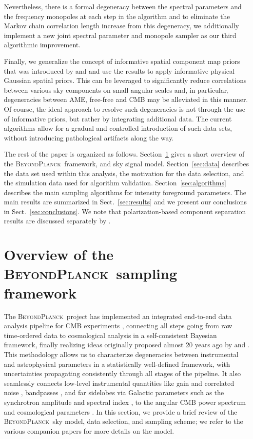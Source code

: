 \documentclass{aa}
\newcommand{\BP}{\textsc{BeyondPlanck}}
\begin{document}
Nevertheless, there is a formal degeneracy between the spectral
parameters and the frequency monopoles at each step in the algorithm
and to eliminate the Markov chain correlation length increase from
this degeneracy, we additionally implement a new joint spectral
parameter and monopole sampler as our third algorithmic improvement.

Finally, we generalize the concept of informative spatial
component map priors that was introduced by
\citet{planck2016-l04} and \citet{npipe} and use the results to apply informative
physical Gaussian spatial priors. This can be leveraged to significantly
reduce correlations between various sky components on small angular
scales and, in particular, degeneracies between AME, free-free and CMB
\citep{bp11} may be alleviated in this manner. Of course, the ideal
approach to resolve such degeneracies is not through the use of informative
priors, but rather by integrating additional data. The
current algorithms allow for a gradual and controlled introduction of
such data sets, without introducing pathological artifacts along the
way. 

The rest of the paper is organized as follows.  Section~\ref{sec:bp}
gives a short overview of the \BP\ framework, and sky
signal model. Section~\ref{sec:data}
describes the data set used within this analysis, the motivation for 
the data selection, and the simulation data used for algorithm validation. Section~\ref{sec:algorithms} describes the main
sampling algorithms for intensity foreground parameters. The main
results are summarized in Sect.~\ref{sec:results} and we present our conclusions
in Sect.~\ref{sec:conclusions}. We note that polarization-based
component separation results are discussed separately by \citet{bp14}.

\section{Overview of the \BP\ sampling framework}
\label{sec:bp}
The \BP\ project has implemented an
integrated end-to-end data analysis pipeline for CMB experiments \citep{bp01},
connecting all steps going from raw time-ordered data to cosmological
analysis in a self-consistent Bayesian framework, finally realizing ideas originally proposed almost 20 years ago by \citet{jewell2004} and \citet{wandelt2004}. This methodology allows us to
characterize degeneracies between instrumental and astrophysical
parameters in a statistically well-defined framework, with
uncertainties propagating consistently through all stages of the
pipeline. It also seamlessly connects low-level instrumental quantities
like gain \citep{bp07} and correlated noise \citep{bp06}, bandpasses
\citep{bp09}, and far sidelobes \citep{bp08} via Galactic parameters
such as the synchrotron amplitude and spectral index \citep[current
  paper and][]{bp14}, to the angular CMB power spectrum and
cosmological parameters \citep{bp11,bp12}. In this section, we provide
a brief review of the \BP\ sky model, data selection, and sampling
scheme; we refer to the various companion
papers for more details on the model.
\end{document}
